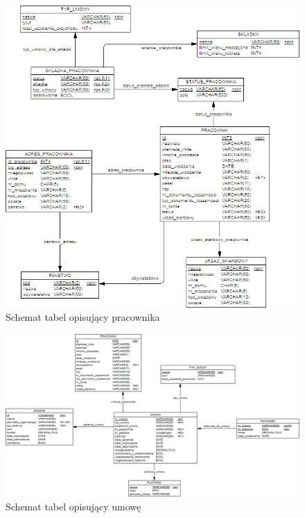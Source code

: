 \begin{figure}[tdh]
    \begin{center}
	\includegraphics[scale=.8]{img/fizyczny2.png}
	\caption{Schemat tabel opisujący pracownika}
	\label{fizyczny2}
    \end{center}
\end{figure}
\begin{figure}[tdh]
    \begin{center}
	\includegraphics[scale=.8,angle=-90]{img/fizyczny3.png}
	\caption{Schemat tabel opisujący umowę}
	\label{fizyczny3}
    \end{center}
\end{figure}

